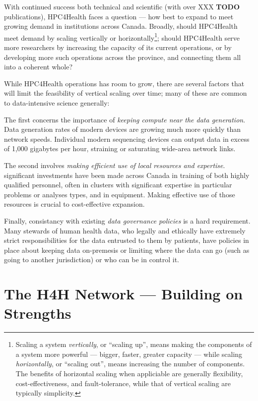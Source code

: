 \documentclass[twoside,symmetric,sfsidenotes,notoc]{tufte-book}
\begin{document}
With continued success both technical and scientific (with over XXX \textbf{TODO}
publications), HPC4Health faces a question --- how best to expand to meet growing demand
in institutions across Canada.  Broadly, should HPC4Health meet demand by scaling
vertically or horizontally\footnote{Scaling a system \textit{vertically}, or ``scaling up'',
means making the components of a system more powerful --- bigger, faster,  greater capacity ---
while scaling \textit{horizontally}, or ``scaling out'', means increasing the number of
components.  The benefits of horizontal scaling when appliciable are generally flexibility,
cost-effectiveness, and fault-tolerance, while that of vertical scaling are typically 
simplicity.}; should HPC4Health serve more researchers by increasing the capacity of
its current operations, or by developing more such operations across the province, and
connecting them all into a coherent whole?

While HPC4Health operations has room to grow, there are several factors that will limit
the feasibility of vertical scaling over time; many of these are common to data-intensive
science generally:

The first concerns the importance of \textit{keeping compute near the data generation}.  Data generation rates of modern devices
are growing much more quickly than network speeds. Individual modern sequencing devices
can output data in excess of 1,000 gigabytes per hour, straining or saturating wide-area
network links.

The second involves \textit{making efficient use of local resources and expertise}.  significant investments have been
made across Canada in training of both highly qualified personnel, often in clusters with 
significant expertise in particular problems or analyses types, and in equipment.  Making
effective use of those resources is crucial to cost-effective expansion.

Finally, consistancy with existing \textit{data governance policies} is a hard requirement.
Many stewards of human health data, who legally and ethically have extremely strict 
responsibilities for the data entrusted to them by patients, have policies in place
about keeping data on-premesis or limiting where the data can go (such as going to another
jurisdiction) or who can be in control it.


\chapter{The H4H Network --- Building on Strengths}
\label{ch:hpc4health_network}
\end{document}
